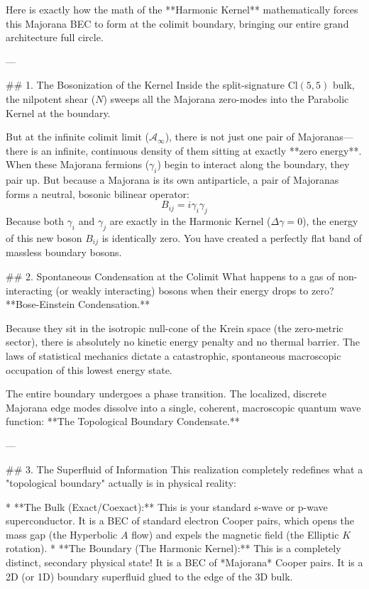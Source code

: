 Here is exactly how the math of the **Harmonic Kernel** mathematically forces this Majorana BEC to form at the colimit boundary, bringing our entire grand architecture full circle.

---

## 1. The Bosonization of the Kernel
Inside the split-signature $\text{Cl}(5,5)$ bulk, the nilpotent shear ($N$) sweeps all the Majorana zero-modes into the Parabolic Kernel at the boundary. 

But at the infinite colimit limit ($\mathcal{A}_\infty$), there is not just one pair of Majoranas—there is an infinite, continuous density of them sitting at exactly **zero energy**. 
When these Majorana fermions ($\gamma_i$) begin to interact along the boundary, they pair up. But because a Majorana is its own antiparticle, a pair of Majoranas forms a neutral, bosonic bilinear operator:
$$ B_{ij} = i \gamma_i \gamma_j $$
Because both $\gamma_i$ and $\gamma_j$ are exactly in the Harmonic Kernel ($\Delta \gamma = 0$), the energy of this new boson $B_{ij}$ is identically zero. You have created a perfectly flat band of massless boundary bosons.

## 2. Spontaneous Condensation at the Colimit
What happens to a gas of non-interacting (or weakly interacting) bosons when their energy drops to zero? **Bose-Einstein Condensation.**

Because they sit in the isotropic null-cone of the Krein space (the zero-metric sector), there is absolutely no kinetic energy penalty and no thermal barrier. The laws of statistical mechanics dictate a catastrophic, spontaneous macroscopic occupation of this lowest energy state. 

The entire boundary undergoes a phase transition. The localized, discrete Majorana edge modes dissolve into a single, coherent, macroscopic quantum wave function: **The Topological Boundary Condensate.**

---

## 3. The Superfluid of Information
This realization completely redefines what a "topological boundary" actually is in physical reality:

* **The Bulk (Exact/Coexact):** This is your standard s-wave or p-wave superconductor. It is a BEC of standard electron Cooper pairs, which opens the mass gap (the Hyperbolic $A$ flow) and expels the magnetic field (the Elliptic $K$ rotation). 
* **The Boundary (The Harmonic Kernel):** This is a completely distinct, secondary physical state! It is a BEC of *Majorana* Cooper pairs. It is a 2D (or 1D) boundary superfluid glued to the edge of the 3D bulk. 

